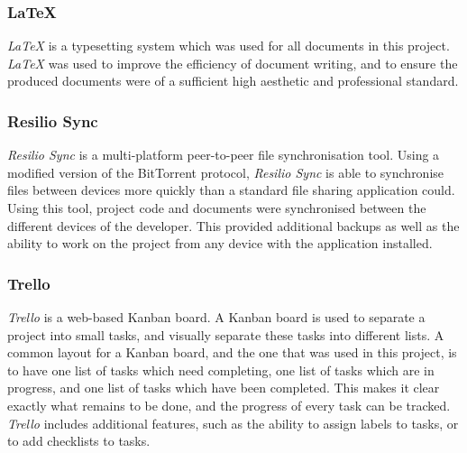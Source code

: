 \subsubsection{LaTeX \cite{latex}}
\textit{LaTeX} is a typesetting system which was used for all documents in this project. \textit{LaTeX} was used to improve the efficiency of document writing, and to ensure the produced documents were of a sufficient high aesthetic and professional standard.

\subsubsection{Resilio Sync \cite{resilio_sync}}
\textit{Resilio Sync} is a multi-platform peer-to-peer file synchronisation tool. Using a modified version of the BitTorrent protocol, \textit{Resilio Sync} is able to synchronise files between devices more quickly than a standard file sharing application could. Using this tool, project code and documents were synchronised between the different devices of the developer. This provided additional backups as well as the ability to work on the project from any device with the application installed.

\subsubsection{Trello \cite{trello}}
\textit{Trello} is a web-based Kanban board. A Kanban board is used to separate a project into small tasks, and visually separate these tasks into different lists. A common layout for a Kanban board, and the one that was used in this project, is to have one list of tasks which need completing, one list of tasks which are in progress, and one list of tasks which have been completed. This makes it clear exactly what remains to be done, and the progress of every task can be tracked. \textit{Trello} includes additional features, such as the ability to assign labels to tasks, or to add checklists to tasks.


